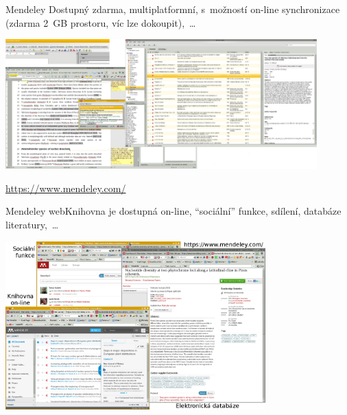 \documentclass[compress, ucs, xelatex, 11pt, xcolor=svgnames, aspectratio=169,
	hyperref={
		bookmarks=true,
		unicode=true,
		colorlinks=true,
		pdftitle={Citacni software},
		plainpages=false,
		pdfauthor={Vojtech Zeisek},
		pdfsubject={Kratky uvod do citacniho software},
		pdfcreator={XeLaTeX},
		pdfkeywords={citace, reference, software, literatura},
		linkcolor=Crimson, %
		anchorcolor=Magenta, %
		citecolor=Magenta, %
		filecolor=Magenta, %
		menucolor=Magenta, %
		urlcolor=DarkTurquoise, %
		pdftex},
	url={hyphens, lowtilde} %
	]{beamer}
\begin{document}
\begin{frame}{Mendeley}
        Dostupný zdarma, multiplatformní, s~možností on-line synchronizace (zdarma 2~GB prostoru, víc lze dokoupit),~\ldots\\
        \begin{center}
                \includegraphics[height=5cm]{mendeley.png}
        \end{center}
        \flushright\url{https://www.mendeley.com/}
\end{frame}

\begin{frame}{Mendeley web}{Knihovna je dostupná on-line, \enquote{sociální} funkce, sdílení, databáze literatury,~\ldots}
        \begin{center}
                \includegraphics[height=6.5cm]{mendeley_web.png}
        \end{center}
\end{frame}
\end{document}

